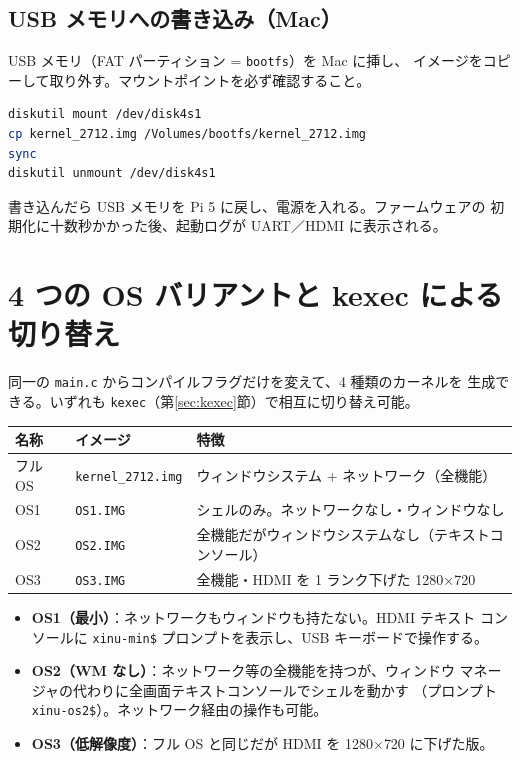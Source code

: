 \documentclass[a4paper,11pt]{ltjsarticle}
\begin{document}
\subsection{USB メモリへの書き込み（Mac）}
USB メモリ（FAT パーティション = \texttt{bootfs}）を Mac に挿し、
イメージをコピーして取り外す。マウントポイントを必ず確認すること。

\begin{lstlisting}[language=bash]
diskutil mount /dev/disk4s1
cp kernel_2712.img /Volumes/bootfs/kernel_2712.img
sync
diskutil unmount /dev/disk4s1
\end{lstlisting}

書き込んだら USB メモリを Pi 5 に戻し、電源を入れる。ファームウェアの
初期化に十数秒かかった後、起動ログが UART／HDMI に表示される。

\section{4 つの OS バリアントと kexec による切り替え}
\label{sec:variants}

同一の \texttt{main.c} からコンパイルフラグだけを変えて、4 種類のカーネルを
生成できる。いずれも \texttt{kexec}（第\ref{sec:kexec}節）で相互に切り替え可能。

\begin{longtable}{lll}
\hline
名称 & イメージ & 特徴 \\
\hline
フル OS & \texttt{kernel\_2712.img} & ウィンドウシステム + ネットワーク（全機能）\\
OS1 & \texttt{OS1.IMG} & シェルのみ。ネットワークなし・ウィンドウなし \\
OS2 & \texttt{OS2.IMG} & 全機能だがウィンドウシステムなし（テキストコンソール）\\
OS3 & \texttt{OS3.IMG} & 全機能・HDMI を 1 ランク下げた 1280$\times$720 \\
\hline
\end{longtable}

\begin{itemize}[noitemsep]
  \item \textbf{OS1（最小）}：ネットワークもウィンドウも持たない。HDMI テキスト
        コンソールに \texttt{xinu-min\$} プロンプトを表示し、USB キーボードで操作する。
  \item \textbf{OS2（WM なし）}：ネットワーク等の全機能を持つが、ウィンドウ
        マネージャの代わりに全画面テキストコンソールでシェルを動かす
        （プロンプト \texttt{xinu-os2\$}）。ネットワーク経由の操作も可能。
  \item \textbf{OS3（低解像度）}：フル OS と同じだが HDMI を 1280$\times$720 に下げた版。
\end{itemize}
\end{document}
